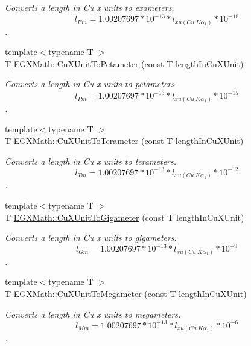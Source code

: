 \begin{DoxyCompactItemize}
\begin{DoxyCompactList}\small\item\em Converts a length in Cu x units to exameters. \[ l_{Em}=1.00207697*10^{-13} * l_{xu(Cu\ K\alpha_1)} * 10^{-18} \]. \end{DoxyCompactList}\item 
{\footnotesize template$<$typename T $>$ }\\T \mbox{\hyperlink{group___e_g_x_math-_conversions-_length_conversions-_non-_s_i-_cu_x_unit-_s_i_ga9e2e713fd8dc5117201b916333d61b76}{E\+G\+X\+Math\+::\+Cu\+X\+Unit\+To\+Petameter}} (const T length\+In\+Cu\+X\+Unit)
\begin{DoxyCompactList}\small\item\em Converts a length in Cu x units to petameters. \[ l_{Pm}=1.00207697*10^{-13} * l_{xu(Cu\ K\alpha_1)} * 10^{-15} \]. \end{DoxyCompactList}\item 
{\footnotesize template$<$typename T $>$ }\\T \mbox{\hyperlink{group___e_g_x_math-_conversions-_length_conversions-_non-_s_i-_cu_x_unit-_s_i_gae67d5afb9164df2584c669f90ee16f9a}{E\+G\+X\+Math\+::\+Cu\+X\+Unit\+To\+Terameter}} (const T length\+In\+Cu\+X\+Unit)
\begin{DoxyCompactList}\small\item\em Converts a length in Cu x units to terameters. \[ l_{Tm}=1.00207697*10^{-13} * l_{xu(Cu\ K\alpha_1)} * 10^{-12} \]. \end{DoxyCompactList}\item 
{\footnotesize template$<$typename T $>$ }\\T \mbox{\hyperlink{group___e_g_x_math-_conversions-_length_conversions-_non-_s_i-_cu_x_unit-_s_i_ga0b99d0bc9eb9a673d2eba2fa595a1866}{E\+G\+X\+Math\+::\+Cu\+X\+Unit\+To\+Gigameter}} (const T length\+In\+Cu\+X\+Unit)
\begin{DoxyCompactList}\small\item\em Converts a length in Cu x units to gigameters. \[ l_{Gm}=1.00207697*10^{-13} * l_{xu(Cu\ K\alpha_1)} * 10^{-9} \]. \end{DoxyCompactList}\item 
{\footnotesize template$<$typename T $>$ }\\T \mbox{\hyperlink{group___e_g_x_math-_conversions-_length_conversions-_non-_s_i-_cu_x_unit-_s_i_ga78c09f3730329cab2764fc8c488f6274}{E\+G\+X\+Math\+::\+Cu\+X\+Unit\+To\+Megameter}} (const T length\+In\+Cu\+X\+Unit)
\begin{DoxyCompactList}\small\item\em Converts a length in Cu x units to megameters. \[ l_{Mm}=1.00207697*10^{-13} * l_{xu(Cu\ K\alpha_1)} * 10^{-6} \]. \end{DoxyCompactList}\item 

\end{DoxyCompactItemize}
